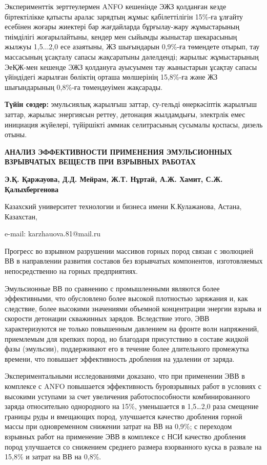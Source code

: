 Эксперименттік зерттеулермен ANFO кешенінде ЭЖЗ қолданған кезде
біртектілікке қатысты аралас зарядтың жұмыс қабілеттілігін 15\%-ға
ұлғайту есебінен жоғары жиектері бар жағдайларда бұрғылау-жару
жұмыстарының тиімділігі жоғарылайтыны, кендер мен сыйымды жыныстар
шекарасының жылжуы 1,5...2,0 есе азаятыны, ЖЗ шығындарын 0,9\%-ға
төмендете отырып, тау массасының ұсақталу сапасы жақсаратыны дәлелденді;
жарылыс жұмыстарының ЭеҚЖ-мен кешенде ЭЖЗ қолдануға ауысуымен тау
жыныстарын ұсақтау сапасы үйіндідегі жарылған бөліктің орташа мөлшерінің
15,8\%-ға және ЖЗ шығындарының 0,8\%-ға төмендеуімен жақсарады.

{\bfseries Түйін сөздер:} эмульсиялық жарылғыш заттар, су-гельді
өнеркәсіптік жарылғыш заттар, жарылыс энергиясын реттеу, детонация
жылдамдығы, электрлік емес инициация жүйелері, түйіршікті аммиак
селитрасының сусымалы қоспасы, дизель отыны.

{\bfseries АНАЛИЗ ЭФФЕКТИВНОСТИ ПРИМЕНЕНИЯ ЭМУЛЬСИОННЫХ ВЗРЫВЧАТЫХ ВЕЩЕСТВ
ПРИ ВЗРЫВНЫХ РАБОТАХ}

{\bfseries Э.Қ. Қаржауова, Д.Д. Мейрам, Ж.Т. Нұртай, А.Ж. Хамит, С.Ж.
Қалыхбергенова}

Казахский университет технологии и бизнеса имени К.Кулажанова, Астана,
Казахстан,

e-mail: karzhauova.81@mail.ru

Прогресс во взрывном разрушении массивов горных пород связан с эволюцией
ВВ в направлении развития составов без взрывчатых компонентов,
изготовляемых непосредственно на горных предприятиях.

Эмульсионные ВВ по сравнению с промышленными являются более
эффективными, что обусловлено более высокой плотностью заряжания и, как
следствие, более высокими значениями объемной концентрации энергии
взрыва и скорости детонации скважинных зарядов. Вследствие этого, ЭВВ
характеризуются не только повышенным давлением на фронте волн
напряжений, приемлемым для крепких пород, но благодаря присутствию в
составе жидкой фазы (эмульсии), поддерживают его в течение более
длительного промежутка времени, что повышает эффективность дробления на
удалении от заряда.

Экспериментальными исследованиями доказано, что при применении ЭВВ в
комплексе с ANFO повышается эффективность буровзрывных работ в условиях
с высокими уступами за счет увеличения работоспособности
комбинированного заряда относительно однородного на 15\%, уменьшается в
1,5\ldots2,0 раза смещение границы руды и вмещающих пород, улучшается
качество дробления горной массы при одновременном снижении затрат на ВВ
на 0,9\%; с переходом взрывных работ на применение ЭВВ в комплексе с НСИ
качество дробления пород улучшается со снижением среднего размера
взорванного куска в развале на 15,8\% и затрат на ВВ на 0,8\%.

